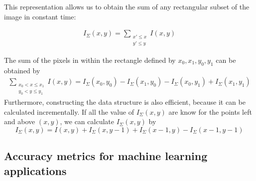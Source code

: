 

This representation allows us to obtain the sum of any rectangular subset
of the image in constant time:

\begin{align}
I_\Sigma (x,y) =   \sum_{\substack{x' \leq x \\ y' \leq y}}I(x,y)
\end{align}

The sum of the pixels in within the rectangle defined by $x_0,x_1,y_0,y_1$ can be obtained by
\begin{align}
\sum_{\substack{ x_0 < x \leq x_1\\ y_0 < y \leq y_1} }I(x,y) = I_\Sigma(x_0,y_0) - I_\Sigma(x_1,y_0)-I_\Sigma(x_0,y_1)+I_\Sigma(x_1,y_1)
\end{align}
Furthermore, constructing the data structure is also efficient, because it can be calculated incrementally. If
all the value of $I_\Sigma(x,y)$ are know for the points left and above $(x,y)$, we can
calculate $I_\Sigma(x,y)$ by
\begin{equation}
I_\Sigma (x,y) = I(x,y) + I_\Sigma (x,y-1)+I_\Sigma (x-1,y)-I_\Sigma (x-1,y-1)
\end{equation}


\subsection{Accuracy metrics for machine learning applications}

